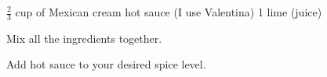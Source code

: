 \dishtype{\sauce}
\dishother{\vegetarian}
\begin{ingreds}
    $\frac{2}{3}$ cup of Mexican cream
    hot sauce (I use Valentina\textsuperscript{\textregistered})
    1 lime (juice)
\end{ingreds}
\begin{method}
    Mix all the ingredients together.\par
    Add hot sauce to your desired spice level.
\end{method}